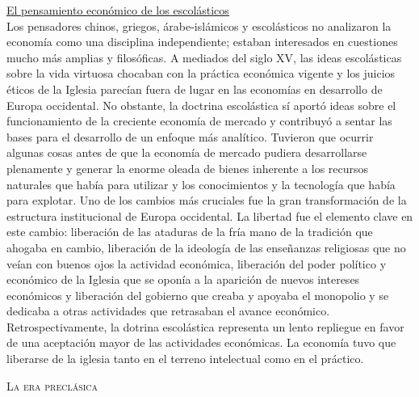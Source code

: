\documentclass[10pt,a4paper]{article}
\begin{document}
\underline{El pensamiento económico de los escolásticos}\\
Los pensadores chinos, griegos, árabe-islámicos y escolásticos no analizaron la economía como una disciplina independiente; estaban interesados en cuestiones mucho más amplias y filosóficas.
A mediados del siglo XV, las ideas escolásticas sobre la vida virtuosa chocaban con la práctica económica vigente y los juicios éticos de la Iglesia parecían fuera de lugar en las economías en desarrollo de Europa occidental. No obstante, la doctrina escolástica sí aportó ideas sobre el funcionamiento de la creciente economía de mercado y contribuyó a sentar las bases para el desarrollo de un enfoque más analítico.
Tuvieron que ocurrir algunas cosas antes de que la economía de mercado pudiera desarrollarse plenamente y generar la enorme oleada de bienes inherente a los recursos naturales que había para utilizar y los conocimientos y la tecnología que había para explotar. Uno de los cambios más cruciales fue la gran transformación de la estructura institucional de Europa occidental. La libertad fue el elemento clave en este cambio: liberación de las ataduras de la fría mano de la tradición que ahogaba en cambio, liberación de la ideología de las enseñanzas religiosas que no veían con buenos ojos la actividad económica, liberación del poder político y económico de la Iglesia que se oponía a la aparición de nuevos intereses económicos y liberación del gobierno que creaba y apoyaba el monopolio y se dedicaba a otras actividades que retrasaban el avance económico. Retrospectivamente, la dotrina escolástica representa un lento repliegue en favor de una aceptación mayor de las actividades económicas. La economía tuvo que liberarse de la iglesia tanto en el terreno intelectual como en el práctico.

\textsc{La era preclásica}
\end{document}
